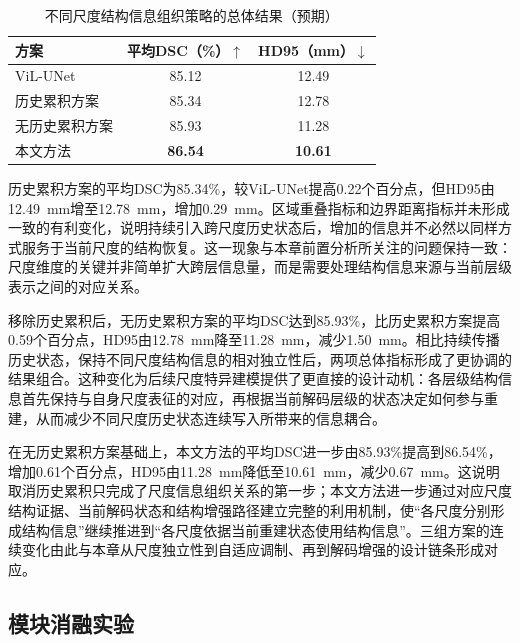 \begin{table}[htbp]
  \centering
  \caption{不同尺度结构信息组织策略的总体结果（预期）}
  \label{tab:ch4-history-strategy}
  \begin{tabular}{lcc}
    \toprule
    方案 & 平均DSC（\%）$\uparrow$ & HD95（mm）$\downarrow$ \\
    \midrule
    ViL-UNet & 85.12 & 12.49 \\
    历史累积方案 & 85.34 & 12.78 \\
    无历史累积方案 & 85.93 & 11.28 \\
    本文方法 & \textbf{86.54} & \textbf{10.61} \\
    \bottomrule
  \end{tabular}
\end{table}

历史累积方案的平均DSC为85.34\%，较ViL-UNet提高0.22个百分点，但HD95由12.49~mm增至12.78~mm，增加0.29~mm。区域重叠指标和边界距离指标并未形成一致的有利变化，说明持续引入跨尺度历史状态后，增加的信息并不必然以同样方式服务于当前尺度的结构恢复。这一现象与本章前置分析所关注的问题保持一致：尺度维度的关键并非简单扩大跨层信息量，而是需要处理结构信息来源与当前层级表示之间的对应关系。

移除历史累积后，无历史累积方案的平均DSC达到85.93\%，比历史累积方案提高0.59个百分点，HD95由12.78~mm降至11.28~mm，减少1.50~mm。相比持续传播历史状态，保持不同尺度结构信息的相对独立性后，两项总体指标形成了更协调的结果组合。这种变化为后续尺度特异建模提供了更直接的设计动机：各层级结构信息首先保持与自身尺度表征的对应，再根据当前解码层级的状态决定如何参与重建，从而减少不同尺度历史状态连续写入所带来的信息耦合。

在无历史累积方案基础上，本文方法的平均DSC进一步由85.93\%提高到86.54\%，增加0.61个百分点，HD95由11.28~mm降低至10.61~mm，减少0.67~mm。这说明取消历史累积只完成了尺度信息组织关系的第一步；本文方法进一步通过对应尺度结构证据、当前解码状态和结构增强路径建立完整的利用机制，使“各尺度分别形成结构信息”继续推进到“各尺度依据当前重建状态使用结构信息”。三组方案的连续变化由此与本章从尺度独立性到自适应调制、再到解码增强的设计链条形成对应。

\subsection{模块消融实验}


